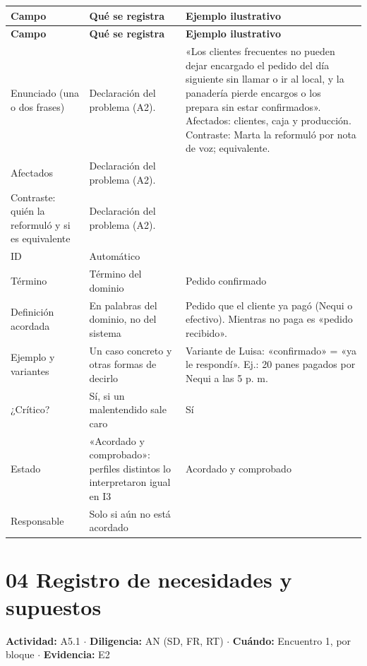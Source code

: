 \documentclass[12pt,letterpaper,oneside]{report}
\begin{document}
{\scriptsize\renewcommand{\arraystretch}{1.25}\setlength{\tabcolsep}{3pt}
\begin{xltabular}{\textwidth}{@{}>{\raggedright\arraybackslash}p{0.25\textwidth}>{\raggedright\arraybackslash}X>{\raggedright\arraybackslash}p{0.30\textwidth}@{}}
\toprule
\textbf{Campo} & \textbf{Qué se registra} & \textbf{Ejemplo ilustrativo} \\
\midrule
\endfirsthead
\toprule
\textbf{Campo} & \textbf{Qué se registra} & \textbf{Ejemplo ilustrativo} \\
\midrule
\endhead
\bottomrule
\endlastfoot
Enunciado (una o dos frases) & Declaración del problema (A2). & «Los clientes frecuentes no pueden dejar encargado el pedido del día siguiente sin llamar o ir al local, y la panadería pierde encargos o los prepara sin estar confirmados». Afectados: clientes, caja y producción. Contraste: Marta la reformuló por nota de voz; equivalente. \\
Afectados & Declaración del problema (A2). &  \\
Contraste: quién la reformuló y si es equivalente & Declaración del problema (A2). &  \\
ID & Automático &  \\
Término & Término del dominio & Pedido confirmado \\
Definición acordada & En palabras del dominio, no del sistema & Pedido que el cliente ya pagó (Nequi o efectivo). Mientras no paga es «pedido recibido». \\
Ejemplo y variantes & Un caso concreto y otras formas de decirlo & Variante de Luisa: «confirmado» = «ya le respondí». Ej.: 20 panes pagados por Nequi a las 5 p. m. \\
¿Crítico? & Sí, si un malentendido sale caro & Sí \\
Estado & «Acordado y comprobado»: perfiles distintos lo interpretaron igual en I3 & Acordado y comprobado \\
Responsable & Solo si aún no está acordado &  \\
\end{xltabular}}

\section{04 Registro de necesidades y supuestos}
\noindent\textbf{Actividad:} A5.1 $\cdot$ \textbf{Diligencia:} AN (SD, FR, RT) $\cdot$ \textbf{Cuándo:} Encuentro 1, por bloque $\cdot$ \textbf{Evidencia:} E2
\end{document}
